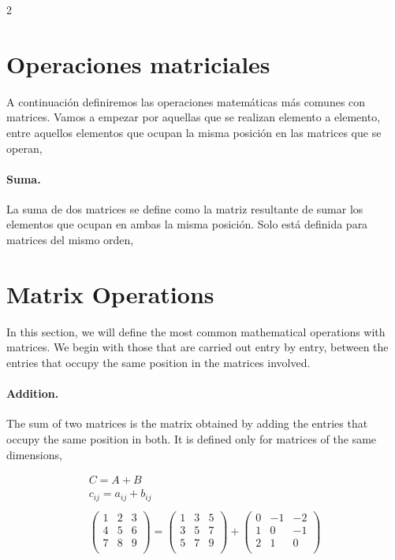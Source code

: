 \begin{paracol}{2}
\section{Operaciones matriciales}\label{opmatr}  
A continuación definiremos las operaciones matemáticas más comunes con matrices. Vamos a empezar por aquellas que se realizan elemento a elemento, entre aquellos elementos que ocupan la misma posición en las matrices que se operan,

\paragraph{Suma.} La suma de dos matrices se define como la matriz resultante de sumar los elementos que ocupan en ambas la misma posición. Solo está definida para matrices del mismo orden,

\switchcolumn
\section{Matrix Operations}
In this section, we will define the most common mathematical operations with matrices. We begin with those that are carried out entry by entry, between the entries that occupy the same position in the matrices involved.

\paragraph{Addition.} The sum of two matrices is the matrix obtained by adding the entries that occupy the same position in both. It is defined only for matrices of the same dimensions, 

\end{paracol}
\begin{gather*}
C=A+B\\
c_{ij}=a_{ij}+b_{ij}\\
\\
\begin{pmatrix}
1& 2& 3\\
4& 5& 6\\
7& 8& 9\\
\end{pmatrix} =
\begin{pmatrix}
1& 3& 5\\
3& 5& 7\\
5& 7& 9\\
\end{pmatrix} +
\begin{pmatrix}
0& -1& -2\\
1& 0& -1\\
2& 1& 0\\
\end{pmatrix}
\end{gather*}
